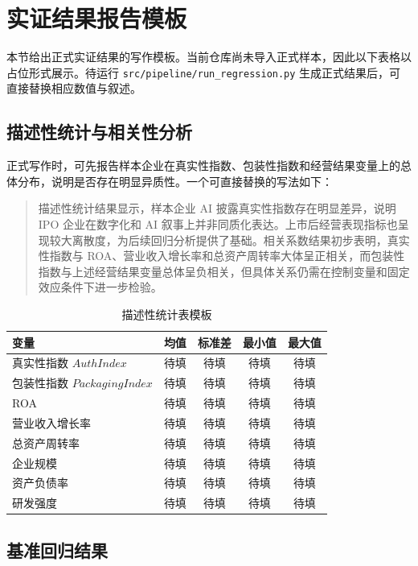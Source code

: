 \section{实证结果报告模板}

本节给出正式实证结果的写作模板。当前仓库尚未导入正式样本，因此以下表格以占位形式展示。待运行 \texttt{src/pipeline/run\_regression.py} 生成正式结果后，可直接替换相应数值与叙述。

\subsection{描述性统计与相关性分析}

正式写作时，可先报告样本企业在真实性指数、包装性指数和经营结果变量上的总体分布，说明是否存在明显异质性。一个可直接替换的写法如下：

\begin{quote}
描述性统计结果显示，样本企业 AI 披露真实性指数存在明显差异，说明 IPO 企业在数字化和 AI 叙事上并非同质化表达。上市后经营表现指标也呈现较大离散度，为后续回归分析提供了基础。相关系数结果初步表明，真实性指数与 ROA、营业收入增长率和总资产周转率大体呈正相关，而包装性指数与上述经营结果变量总体呈负相关，但具体关系仍需在控制变量和固定效应条件下进一步检验。
\end{quote}

\begin{table}[H]
\centering
\caption{描述性统计表模板}
\begin{tabular}{lcccc}
\toprule
变量 & 均值 & 标准差 & 最小值 & 最大值 \\
\midrule
真实性指数 $AuthIndex$ & 待填 & 待填 & 待填 & 待填 \\
包装性指数 $PackagingIndex$ & 待填 & 待填 & 待填 & 待填 \\
ROA & 待填 & 待填 & 待填 & 待填 \\
营业收入增长率 & 待填 & 待填 & 待填 & 待填 \\
总资产周转率 & 待填 & 待填 & 待填 & 待填 \\
企业规模 & 待填 & 待填 & 待填 & 待填 \\
资产负债率 & 待填 & 待填 & 待填 & 待填 \\
研发强度 & 待填 & 待填 & 待填 & 待填 \\
\bottomrule
\end{tabular}
\end{table}

\subsection{基准回归结果}

